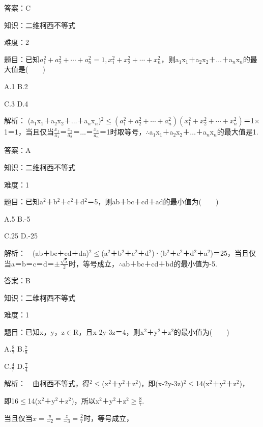 \documentclass{article} %
\begin{document}
 答案：C

 

 知识：二维柯西不等式

 难度：2

 题目：已知$a_1^2+a_2^2+\cdots+a_n^2=1, x_1^2+x_2^2+\cdots+x_n^2$，则a${}_{1}$x${}_{1}$＋a${}_{2}$x${}_{2}$＋{$\dots$}＋a${}_{n}$x${}_{n}$的最大值是(　　)

A.1  B.2  

C.3  D.4

 解析： (a${}_{1}$x${}_{1}$＋a${}_{2}$x${}_{2}$＋{$\dots$}＋a${}_{n}$x${}_{n}$)${}^{2}$$\mathrm{\le}(a_1^2+a_2^2+\cdots +a_n^2)(x_1^2+x_2^2+\cdots +x_n^2)$＝1$\mathrm{\times}$1＝1，当且仅当$\frac{x_1}{a_1}$＝$\frac{x_2}{a_2}$＝{$\dots$}＝$\frac{x_n}{a_n}$＝1时取等号，$\mathrm{\therefore}$a${}_{1}$x${}_{1}$＋a${}_{2}$x${}_{2}$＋{$\dots$}＋a${}_{n}$x${}_{n}$的最大值是1.

 答案：A

 

 知识：二维柯西不等式

 难度：1

 题目：已知a${}^{2}$＋b${}^{2}$＋c${}^{2}$＋d${}^{2}$＝5，则ab＋bc＋cd＋ad的最小值为(　　)

A.5  B.-5  

C.25  D.-25

 解析：　(ab＋bc＋cd＋da)${}^{2}$$\mathrm{\le}$(a${}^{2}$＋b${}^{2}$＋c${}^{2}$＋d${}^{2}$)·(b${}^{2}$＋c${}^{2}$＋d${}^{2}$＋a${}^{2}$)＝25，当且仅当a＝b＝c＝d＝$\mathrm{\pm}\frac{\sqrt{5}}{2}$时，等号成立，$\mathrm{\therefore}$ab＋bc＋cd＋bd的最小值为-5.

 答案：B

 

 知识：二维柯西不等式

 难度：1

 题目：已知x，y，z$\mathrm{\in}$R，且x-2y-3z＝4，则x${}^{2}$＋y${}^{2}$＋z${}^{2}$的最小值为(　　)

A.$\frac{8}{7}$   B.$\frac{7}{8}$  

C.$\frac{4}{7}$   D.$\frac{7}{4}$

 解析：　由柯西不等式，得${}^{2}$$\mathrm{\le}$(x${}^{2}$＋y${}^{2}$＋z${}^{2}$)，即(x-2y-3z)${}^{2}$$\mathrm{\le}$14(x${}^{2}$＋y${}^{2}$＋z${}^{2}$)，

即16$\mathrm{\le}$14(x${}^{2}$＋y${}^{2}$＋z${}^{2}$)，所以x${}^{2}$＋y${}^{2}$＋z${}^{2}$$\mathrm{\ge}\frac{8}{7}$.

当且仅当$x=\frac{y}{-2}=\frac{z}{-3}=\frac{2}{7}$时，等号成立，
\end{document}
